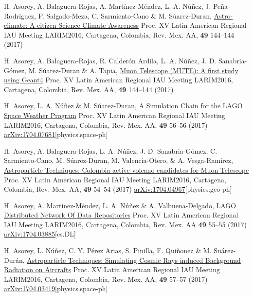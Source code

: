 \begin{etaremune}
\item {} H. Asorey, A. Balaguera-Rojas, A. Martínez-Méndez, L. A. Núñez, J. Peña-Rodríguez, P. Salgado-Meza, C. Sarmiento-Cano \& M. Súarez-Duran, \href{http://www.astroscu.unam.mx/rmaa/RMxAC..49/PDF/RMxAC..49\_poster2.pdf}{{Astro-climate: A citizen Science Climate Awareness}} \en Proc.
XV Latin American Regional IAU Meeting LARIM2016, Cartagena, Colombia, Rev.
Mex.
AA, {\textbf{49}} 144--144 (2017)

\item {} H. Asorey, A. Balaguera-Rojas, R. Calderón Ardila, L. A. Núñez, J. D. Sanabria-Gómez, M. Súarez-Duran \& A. Tapia, \href{http://www.astroscu.unam.mx/rmaa/RMxAC..49/PDF/RMxAC..49\_poster2.pdf}{{Muon Telescope (MUTE): A first study using Geant4}} \en Proc.
XV Latin American Regional IAU Meeting LARIM2016, Cartagena, Colombia, Rev.
Mex.
AA, {\textbf{49}} 144--144 (2017)

\item {} H. Asorey, L. A. Núñez \& M. Súarez-Duran, \href{http://www.astroscu.unam.mx/rmaa/RMxAC..49/PDF/RMxAC..49\_oral6.pdf}{{A Simulation Chain for the LAGO Space Weather Program}} \en Proc.
XV Latin American Regional IAU Meeting LARIM2016, Cartagena, Colombia, Rev.
Mex.
AA, {\textbf{49}} 56--56 (2017) \href{http://arxiv.org/abs/1704.07681}{arXiv:1704.07681}[physics.space-ph]

\item {} H. Asorey, A. Balaguera-Rojas, L. A. Núñez, J. D. Sanabria-Gómez, C. Sarmiento-Cano, M. Súarez-Duran, M. Valencia-Otero, \& A. Vesga-Ramírez, \href{http://www.astroscu.unam.mx/rmaa/RMxAC..49/PDF/RMxAC..49\_oral4.pdf}{{Astroparticle Techniques: Colombia active volcano candidates for Muon Telescope}} \en Proc.
XV Latin American Regional IAU Meeting LARIM2016, Cartagena, Colombia, Rev.
Mex.
AA, {\textbf{49}} 54--54 (2017) \href{http://arxiv.org/abs/1704.04967}{arXiv:1704.04967}[physics.geo-ph]

\item {}H. Asorey, A. Martínez-Méndez, L. A. Núñez \& A. Valbuena-Delgado, \href{http://www.astroscu.unam.mx/rmaa/RMxAC..49/PDF/RMxAC..49\_oral5.pdf}{{LAGO Distributed Network Of Data Repositories}} \en Proc.
XV Latin American Regional IAU Meeting LARIM2016, Cartagena, Colombia, Rev.
Mex.
AA {\textbf{49}} 55--55 (2017) \href{http://arxiv.org/abs/1704.03885}{arXiv:1704.03885}[cs.DL]

\item {}H. Asorey, L. Núñez, C. Y. Pérez Arias, S. Pinilla, F. Quiñonez \& M. Suárez-Durán, \href{http://www.astroscu.unam.mx/rmaa/RMxAC..49/PDF/RMxAC..49\_oral7.pdf}{{Astroparticle Techniques: Simulating Cosmic Rays induced Background Radiation on Aircrafts}} \en Proc.
XV Latin American Regional IAU Meeting LARIM2016, Cartagena, Colombia, Rev.
Mex.
AA, {\textbf{49}} 57--57 (2017) \href{http://arxiv.org/abs/1704.03419}{arXiv:1704.03419}[physics.space-ph]


\end{etaremune}
